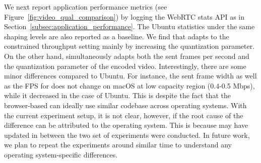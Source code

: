 We next report application performance metrics (see Figure~\ref{fig:video_qual_comparison}) by logging the WebRTC stats API as in Section~\ref{subsec:application_performance}. The Ubuntu statistics under the same shaping levels are also reported as a baseline. We find that \meet adapts to the constrained throughput setting mainly by increasing the quantization parameter. On the other hand, \teamsbrowser simultaneously adapts both the sent frames per second and the quantization parameter of the encoded video. Interestingly, there are some minor differences compared to Ubuntu. For instance, the sent frame width as well as the FPS for \meet does not change on macOS at low capacity region (0.4-0.5 Mbps), while it decreased in the case of Ubuntu. This is despite the fact that the browser-based \meet can ideally use similar codebase across operating systems. With the current experiment setup, it is not clear, however, if the root cause of the difference can be attributed to the operating system. This is because \meet may have updated in between the two set of experiments were conducted. In future work, we plan to repeat the experiments around similar time to understand any operating system-specific differences. 

